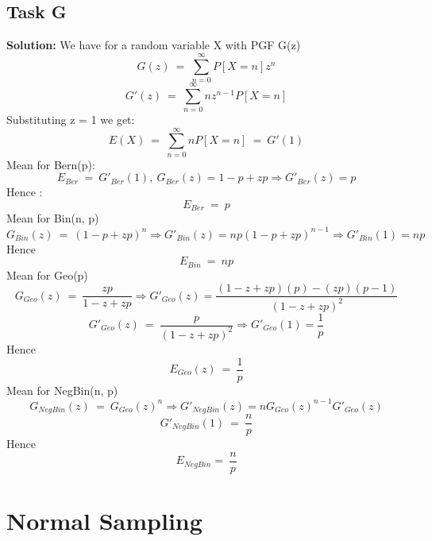 \documentclass[12pt]{article}
\begin{document}
\subsection{Task G}
\textbf{Solution: } \newline
We have for a random variable X with PGF G(z)
\[G(z)\ =\ \sum_{n=0}^{\infty}P[X=n]z^n\]
\[G'(z)\ =\ \sum_{n=0}^{\infty}nz^{n-1}P[X=n]\]
Substituting z = 1 we get:
\begin{equation}
    E(X)\ =\ \sum_{n=0}^{\infty}nP[X=n]\ =\ G'(1)
\end{equation}
Mean for Bern(p):
\[E_{Ber}\ =\ G'_{Ber}(1),\ G_{Ber}(z)=1-p+zp \Rightarrow G'_{Ber}(z)=p \]
Hence :
\begin{equation}
    E_{Ber}\ =\ p
\end{equation}
Mean for Bin(n, p)
\[G_{Bin}(z)\ =\ (1-p+zp)^n \Rightarrow G'_{Bin}(z)=np(1-p+zp)^{n-1} \Rightarrow G'_{Bin}(1)=np\]
Hence 
\begin{equation}
    E_{Bin}\ =\ np
\end{equation}
Mean for Geo(p)
\[G_{Geo}(z)\ =\ \frac{zp}{1-z+zp} \Rightarrow G'_{Geo}(z)=\frac{(1-z+zp)(p)-(zp)(p-1)}{(1-z+zp)^2}\]
\[G'_{Geo}(z)\ =\ \frac{p}{(1-z+zp)^2} \Rightarrow G'_{Geo}(1)=\frac{1}{p}\]
Hence
\begin{equation}
    E_{Geo}(z)\ =\ \frac{1}{p}
\end{equation}
Mean for NegBin(n, p)
\[G_{NegBin}(z)\ =\ G_{Geo}(z)^{n} \Rightarrow G'_{NegBin}(z)=nG_{Geo}(z)^{n-1}G'_{Geo}(z)\]
\[G'_{NegBin}(1)\ =\ \frac{n}{p}\]
Hence 
\[E_{NegBin} =\ \frac{n}{p}\]


\section{Normal Sampling}
\end{document}
